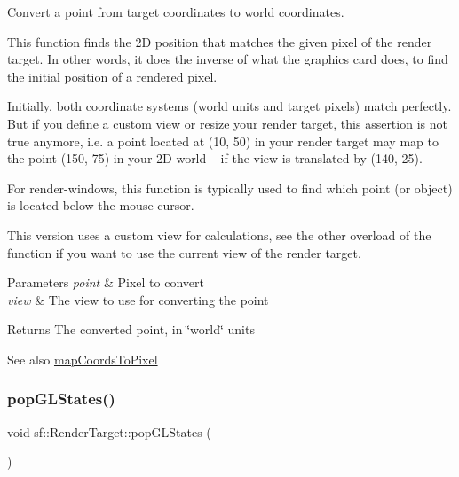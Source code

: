 Convert a point from target coordinates to world coordinates. 

This function finds the 2D position that matches the given pixel of the render target. In other words, it does the inverse of what the graphics card does, to find the initial position of a rendered pixel.

Initially, both coordinate systems (world units and target pixels) match perfectly. But if you define a custom view or resize your render target, this assertion is not true anymore, i.\+e. a point located at (10, 50) in your render target may map to the point (150, 75) in your 2D world -- if the view is translated by (140, 25).

For render-\/windows, this function is typically used to find which point (or object) is located below the mouse cursor.

This version uses a custom view for calculations, see the other overload of the function if you want to use the current view of the render target.


\begin{DoxyParams}{Parameters}
{\em point} & Pixel to convert \\
\hline
{\em view} & The view to use for converting the point\\
\hline
\end{DoxyParams}
\begin{DoxyReturn}{Returns}
The converted point, in \char`\"{}world\char`\"{} units
\end{DoxyReturn}
\begin{DoxySeeAlso}{See also}
\mbox{\hyperlink{classsf_1_1_render_target_ad92a9f0283aa5f3f67e473c1105b68cf}{map\+Coords\+To\+Pixel}} \begin{DoxyVerb}\end{DoxyVerb}
 
\end{DoxySeeAlso}
\mbox{\label{classsf_1_1_render_target_ad5a98401113df931ddcd54c080f7aa8e}} 
\subsubsection{\texorpdfstring{popGLStates()}{popGLStates()}}
{\footnotesize\ttfamily void sf\+::\+Render\+Target\+::pop\+G\+L\+States (\begin{DoxyParamCaption}{ }\end{DoxyParamCaption})}



